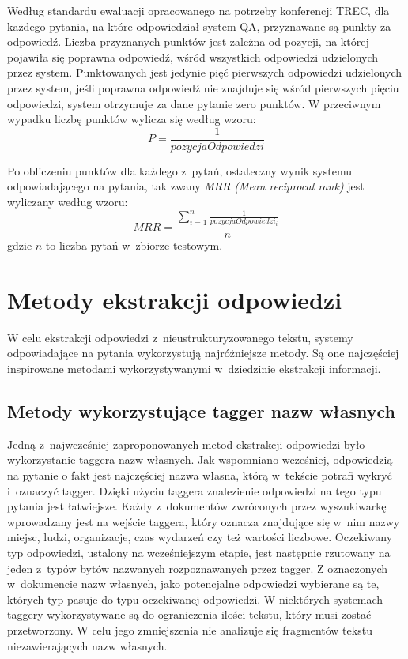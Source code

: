 \documentclass[a4paper, twoside, openright, 12pt]{report}
\begin{document}
        Według standardu ewaluacji opracowanego na potrzeby konferencji TREC, dla każdego pytania, na które odpowiedział
        system QA, przyznawane są punkty za odpowiedź. Liczba przyznanych punktów jest zależna od pozycji, na której
        pojawiła się poprawna odpowiedź, wśród wszystkich odpowiedzi udzielonych przez system. Punktowanych jest
        jedynie pięć pierwszych odpowiedzi udzielonych przez system, jeśli poprawna odpowiedź nie znajduje się wśród
        pierwszych pięciu odpowiedzi, system otrzymuje za dane pytanie zero punktów. W przeciwnym wypadku liczbę punktów
        wylicza się według wzoru: $$ P = \frac{1}{pozycjaOdpowiedzi} $$

        Po obliczeniu punktów dla każdego z~pytań, ostateczny wynik systemu odpowiadającego na pytania, tak zwany
        \emph{MRR (Mean reciprocal rank)} jest wyliczany według wzoru:
        $$ MRR = \frac{\sum_{i=1}^{n} \frac{1}{pozycjaOdpowiedzi_i}}{n} $$
        gdzie \( n \) to liczba pytań w~zbiorze testowym\cite{QATESTCOLLECTION}.

    \section{Metody ekstrakcji odpowiedzi} \label{ANSWEREXTRACTION}
        W celu ekstrakcji odpowiedzi z~nieustrukturyzowanego tekstu, systemy odpowiadające na pytania wykorzystują
        najróżniejsze metody. Są one najczęściej inspirowane metodami wykorzystywanymi w~dziedzinie ekstrakcji informacji.

        \subsection{Metody wykorzystujące tagger nazw własnych}
            Jedną z~najwcześniej zaproponowanych metod ekstrakcji odpowiedzi było wykorzystanie taggera nazw własnych.
            Jak wspomniano wcześniej, odpowiedzią na pytanie o fakt jest najczęściej nazwa własna, którą w~tekście
            potrafi wykryć i~oznaczyć tagger. Dzięki użyciu taggera znalezienie odpowiedzi na tego typu pytania jest
            łatwiejsze.  Każdy z~dokumentów zwróconych przez wyszukiwarkę wprowadzany jest na wejście taggera, który
            oznacza znajdujące się w~nim nazwy miejsc, ludzi, organizacje, czas wydarzeń czy też wartości liczbowe.
            Oczekiwany typ odpowiedzi, ustalony na wcześniejszym etapie, jest następnie rzutowany na jeden z~typów
            bytów nazwanych rozpoznawanych przez tagger. Z oznaczonych w~dokumencie nazw własnych, jako potencjalne
            odpowiedzi wybierane są te, których typ pasuje do typu oczekiwanej odpowiedzi. W niektórych systemach
            taggery wykorzystywane są do ograniczenia ilości tekstu, który musi zostać przetworzony. W celu jego
            zmniejszenia nie analizuje się fragmentów tekstu niezawierających nazw własnych.
\end{document}
